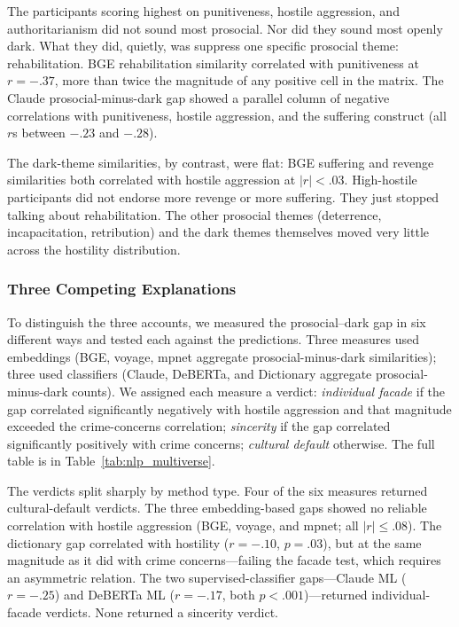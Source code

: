 The participants scoring highest on punitiveness, hostile aggression, and authoritarianism did not sound most prosocial. Nor did they sound most openly dark. What they did, quietly, was suppress one specific prosocial theme: rehabilitation. BGE rehabilitation similarity correlated with punitiveness at $r = -.37$, more than twice the magnitude of any positive cell in the matrix. The Claude prosocial-minus-dark gap showed a parallel column of negative correlations with punitiveness, hostile aggression, and the suffering construct (all $r$s between $-.23$ and $-.28$).

The dark-theme similarities, by contrast, were flat: BGE suffering and revenge similarities both correlated with hostile aggression at $|r| < .03$. High-hostile participants did not endorse more revenge or more suffering. They just stopped talking about rehabilitation. The other prosocial themes (deterrence, incapacitation, retribution) and the dark themes themselves moved very little across the hostility distribution.

\subsubsection{Three Competing Explanations}

To distinguish the three accounts, we measured the prosocial--dark gap in six different ways and tested each against the predictions. Three measures used embeddings (BGE, voyage, mpnet aggregate prosocial-minus-dark similarities); three used classifiers (Claude, DeBERTa, and Dictionary aggregate prosocial-minus-dark counts). We assigned each measure a verdict: \textit{individual facade} if the gap correlated significantly negatively with hostile aggression and that magnitude exceeded the crime-concerns correlation; \textit{sincerity} if the gap correlated significantly positively with crime concerns; \textit{cultural default} otherwise. The full table is in Table~\ref{tab:nlp_multiverse}.

The verdicts split sharply by method type. Four of the six measures returned cultural-default verdicts. The three embedding-based gaps showed no reliable correlation with hostile aggression (BGE, voyage, and mpnet; all $|r| \leq .08$). The dictionary gap correlated with hostility ($r = -.10$, $p = .03$), but at the same magnitude as it did with crime concerns---failing the facade test, which requires an asymmetric relation. The two supervised-classifier gaps---Claude ML ($r = -.25$) and DeBERTa ML ($r = -.17$, both $p < .001$)---returned individual-facade verdicts. None returned a sincerity verdict.


